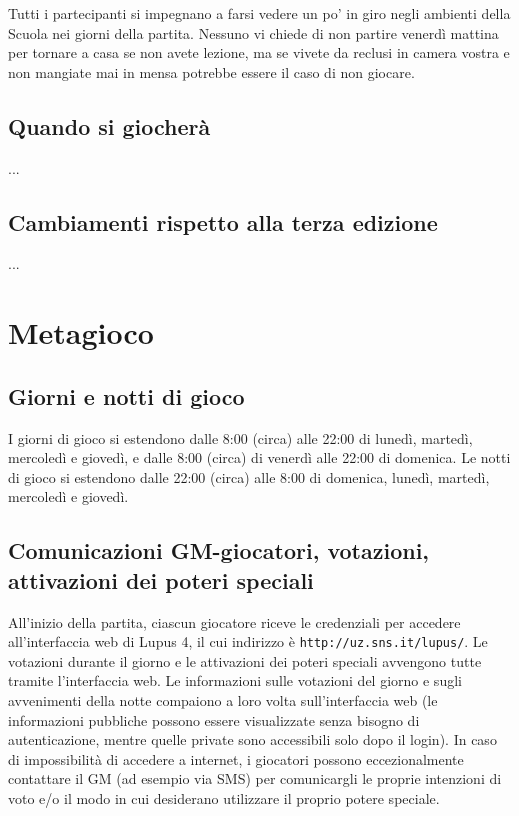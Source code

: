 \documentclass[a4paper,10pt]{article}
\begin{document}
Tutti i partecipanti si impegnano a farsi vedere un po' in giro negli ambienti della Scuola nei giorni della partita. Nessuno vi chiede di non partire venerdì mattina per tornare a casa se non avete lezione, ma se vivete da reclusi in camera vostra e non mangiate mai in mensa potrebbe essere il caso di non giocare.


\subsection{Quando si giocherà}

...


\subsection{Cambiamenti rispetto alla terza edizione}

...


\pagebreak
\section{Metagioco}

\subsection{Giorni e notti di gioco}

I giorni di gioco si estendono dalle 8:00 (circa) alle 22:00 di lunedì, martedì, mercoledì e giovedì, e dalle 8:00 (circa) di venerdì alle 22:00 di domenica.
Le notti di gioco si estendono dalle 22:00 (circa) alle 8:00 di domenica, lunedì, martedì, mercoledì e giovedì.



\subsection{Comunicazioni GM-giocatori, votazioni, attivazioni dei poteri speciali}

All'inizio della partita, ciascun giocatore riceve le credenziali per accedere all'interfaccia web di Lupus 4, il cui indirizzo è \verb|http://uz.sns.it/lupus/|.
Le votazioni durante il giorno e le attivazioni dei poteri speciali avvengono tutte tramite l'interfaccia web. Le informazioni sulle votazioni del giorno e sugli avvenimenti della notte compaiono a loro volta sull'interfaccia web (le informazioni pubbliche possono essere visualizzate senza bisogno di autenticazione, mentre quelle private sono accessibili solo dopo il login).
In caso di impossibilità di accedere a internet, i giocatori possono eccezionalmente contattare il GM (ad esempio via SMS) per comunicargli le proprie intenzioni di voto e/o il modo in cui desiderano utilizzare il proprio potere speciale.
\end{document}
